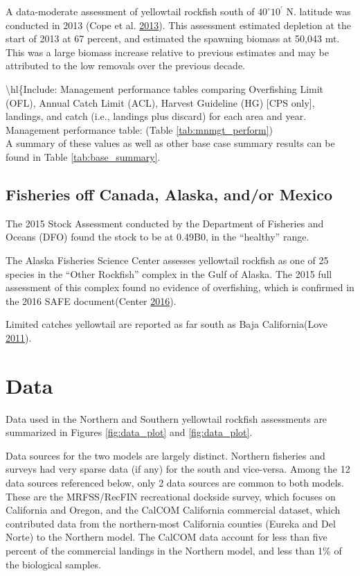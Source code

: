 \documentclass[12pt,]{article}
\begin{document}
A data-moderate assessment of yellowtail rockfish south of
\(40^\circ 10^\prime\) N. latitude was conducted in 2013 (Cope et al.
\protect\hyperlink{ref-Cope2013}{2013}). This assessment estimated
depletion at the start of 2013 at 67 percent, and estimated the spawning
biomass at 50,043 mt. This was a large biomass increase relative to
previous estimates and may be attributed to the low removals over the
previous decade.

\textbackslash{}hl\{Include: Management performance tables comparing
Overfishing Limit (OFL), Annual Catch Limit (ACL), Harvest Guideline
(HG) {[}CPS only{]}, landings, and catch (i.e., landings plus discard)
for each area and year. Management performance table: (Table
\ref{tab:mnmgt_perform})\\
A summary of these values as well as other base case summary results can
be found in Table \ref{tab:base_summary}.

\subsection{Fisheries off Canada, Alaska, and/or
Mexico}\label{fisheries-off-canada-alaska-andor-mexico}

The 2015 Stock Assessment conducted by the Department of Fisheries and
Oceans (DFO) found the stock to be at 0.49B0, in the ``healthy'' range.

The Alaska Fisheries Science Center assesses yellowtail rockfish as one
of 25 species in the ``Other Rockfish'' complex in the Gulf of Alaska.
The 2015 full assessment of this complex found no evidence of
overfishing, which is confirmed in the 2016 SAFE document(Center
\protect\hyperlink{ref-AFSC2016}{2016}).

Limited catches yellowtail are reported as far south as Baja
California(Love \protect\hyperlink{ref-Love2011}{2011}).

\newpage

\captionsetup[table]{labelformat=empty,justification=raggedright,font=bf, singlelinecheck=false}

\section{Data}\label{data}

Data used in the Northern and Southern yellowtail rockfish assessments
are summarized in Figures \ref{fig:data_plot} and \ref{fig:data_plot}.

Data sources for the two models are largely distinct. Northern fisheries
and surveys had very sparse data (if any) for the south and vice-versa.
Among the 12 data sources referenced below, only 2 data sources are
common to both models. These are the MRFSS/RecFIN recreational dockside
survey, which focuses on California and Oregon, and the CalCOM
California commercial dataset, which contributed data from the
northern-most California counties (Eureka and Del Norte) to the Northern
model. The CalCOM data account for less than five percent of the
commercial landings in the Northern model, and less than 1\% of the
biological samples.
\end{document}
